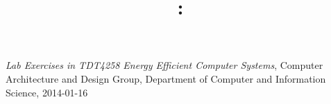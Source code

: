 \documentclass{article}
\title{
\vspace{2in}
\textmd{\textbf{\exerciseClass: \exerciseTitle}}\\
\vspace{3in}
\exerciseGroupMembers
}
\author{\textbf{\exerciseGroup}}
\date{} %
\begin{document}
\maketitle

\newpage 

\newpage 

\newpage 

\newpage 

\newpage 

\newpage 

\newpage 

\newpage
%

\begin{thebibliography}{9}

  \emph{Lab Exercises in TDT4258 Energy Efficient Computer Systems},
  Computer Architecture and Design Group,
  Department of Computer and Information Science,
  2014-01-16

\end{thebibliography}
\end{document}
